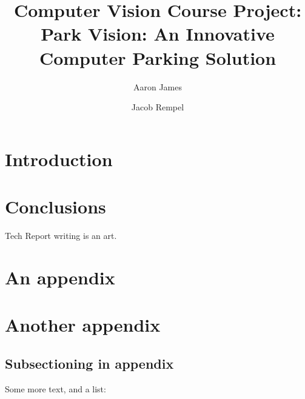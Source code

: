 \documentclass[12pt, letterpaper, twoside]{article}
\title{\textbf{Computer Vision Course Project:\\Park Vision: An Innovative Computer Parking Solution}} %
\author{Aaron James \and Jacob Rempel} %
\affiliation{Ontario Tech University} %
\begin{document}
\maketitle

\begin{abstract}
    \noindent
    
    \blindtext[1] %

\end{abstract}

\vspace{2.5cm}


\thispagestyle{firstpage}

\pagebreak


\newgeometry{} %

\section{Introduction}
\label{sec:intro}

\blindmathpaper %

\section{Conclusions}
\label{sec:conc}

Tech Report writing is an art.




% 
% 

\appendix

\section{An appendix}

\blindtext %

\section{Another appendix}

\subsection*{Subsectioning in appendix}

Some more text, and a list:

\blindenumerate %
\end{document}
